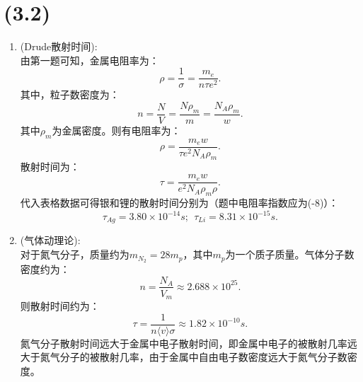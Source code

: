 \documentclass[reqno,a4paper,12pt]{amsart}
\begin{document}
\section{(3.2)}
\begin{enumerate}
	\item (Drude散射时间): \\
	由第一题可知，金属电阻率为：
	\[
		\rho = \frac{1}{\sigma} = \frac{m_e}{n\tau e^2}.
	\]
	其中，粒子数密度为：
	\[
		n = \frac{N}{V} = \frac{N\rho_m}{m} = \frac{N_A \rho_m}{w}.
	\]
	其中$\rho_m$为金属密度。则有电阻率为：
	\[
		\rho = \frac{m_ew}{\tau e^2N_A\rho_m}.
	\]
	散射时间为：
	\[
		\tau = \frac{m_ew}{e^2N_A\rho_m\rho}.
	\]
	代入表格数据可得银和锂的散射时间分别为（题中电阻率指数应为(-8)）：
	\[
		\tau_{Ag} = 3.80 \times 10^{-14}s; ~~ \tau_{Li} = 8.31 \times 10^{-15}s.
	\]
	
	\item (气体动理论): \\
	对于氮气分子，质量约为$m_{N_2} = 28m_p$，其中$m_p$为一个质子质量。气体分子数密度约为：
	\[
		n = \frac{N_A}{V_m} \approx 2.688\times 10^{25}.
	\]
	则散射时间约为：
	\[
		\tau = \frac{1}{n\langle v \rangle\sigma} \approx 1.82 \times 10^{-10}s.
	\]
	氮气分子散射时间远大于金属中电子散射时间，即金属中电子的被散射几率远大于氮气分子的被散射几率，由于金属中自由电子数密度远大于氮气分子数密度。
\end{enumerate}
\end{document}
